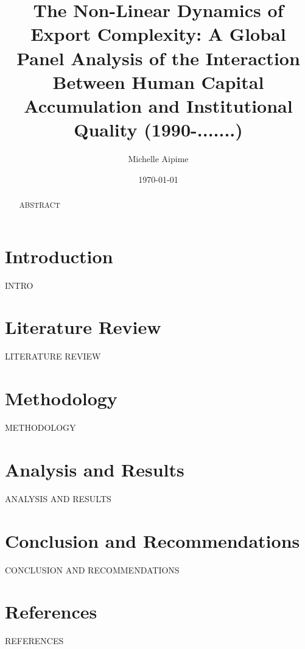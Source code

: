 \documentclass[12pt]{article} %
\title{The Non-Linear Dynamics of Export Complexity: A Global Panel Analysis of the Interaction Between Human Capital Accumulation and Institutional Quality (1990-.......)}
\author{Michelle Aipime}
\date{\today}
\begin{document}
\maketitle %

\begin{abstract}
ABSTRACT
\end{abstract}

\section{Introduction}
INTRO

\section{Literature Review}
LITERATURE REVIEW

\section{Methodology}
METHODOLOGY

\section{Analysis and Results}
ANALYSIS AND RESULTS

\section{Conclusion and Recommendations}
CONCLUSION AND RECOMMENDATIONS

\section{References}
REFERENCES
\end{document}
